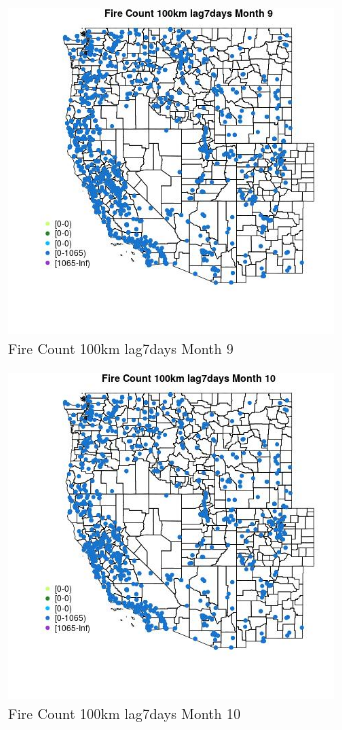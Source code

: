 \begin{figure} 
\centering  
\includegraphics[width=0.77\textwidth]{Code_Outputs/Report_ML_input_PM25_Step4_part_f_de_duplicated_aveswNAs_MapObsMo9Fire_Count_100km_lag7days.jpg} 
\caption{\label{fig:Report_ML_input_PM25_Step4_part_f_de_duplicated_aveswNAsMapObsMo9Fire_Count_100km_lag7days}Fire Count 100km lag7days Month 9} 
\end{figure} 
 

\begin{figure} 
\centering  
\includegraphics[width=0.77\textwidth]{Code_Outputs/Report_ML_input_PM25_Step4_part_f_de_duplicated_aveswNAs_MapObsMo10Fire_Count_100km_lag7days.jpg} 
\caption{\label{fig:Report_ML_input_PM25_Step4_part_f_de_duplicated_aveswNAsMapObsMo10Fire_Count_100km_lag7days}Fire Count 100km lag7days Month 10} 
\end{figure} 
 

